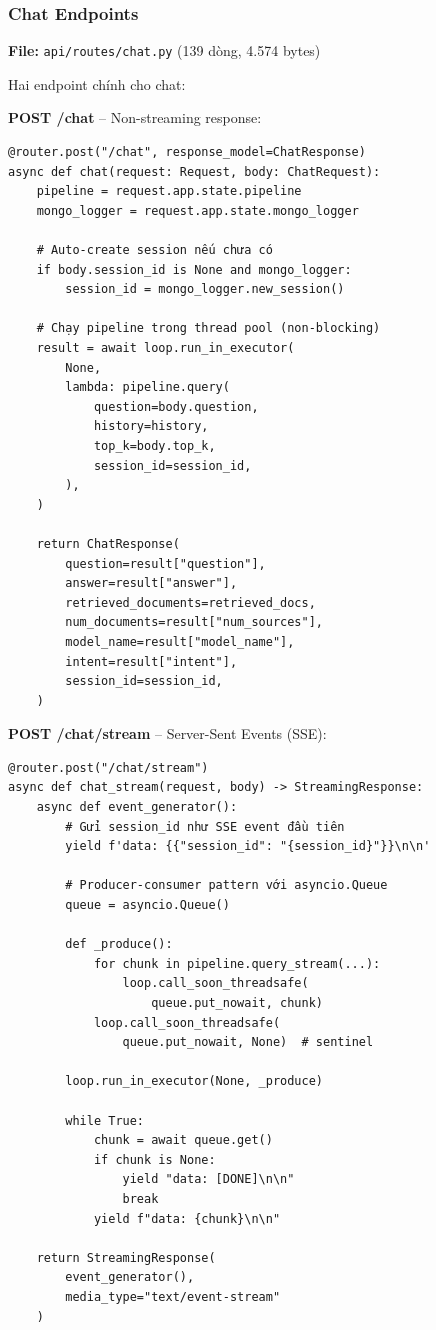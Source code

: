 \documentclass[../DoAn.tex]{subfiles}
\begin{document}
\subsubsection{Chat Endpoints}
\textbf{File:} \texttt{api/routes/chat.py} (139 dòng, 4.574 bytes)

Hai endpoint chính cho chat:

\textbf{POST /chat} -- Non-streaming response:
\begin{verbatim}
@router.post("/chat", response_model=ChatResponse)
async def chat(request: Request, body: ChatRequest):
    pipeline = request.app.state.pipeline
    mongo_logger = request.app.state.mongo_logger

    # Auto-create session nếu chưa có
    if body.session_id is None and mongo_logger:
        session_id = mongo_logger.new_session()

    # Chạy pipeline trong thread pool (non-blocking)
    result = await loop.run_in_executor(
        None,
        lambda: pipeline.query(
            question=body.question,
            history=history,
            top_k=body.top_k,
            session_id=session_id,
        ),
    )

    return ChatResponse(
        question=result["question"],
        answer=result["answer"],
        retrieved_documents=retrieved_docs,
        num_documents=result["num_sources"],
        model_name=result["model_name"],
        intent=result["intent"],
        session_id=session_id,
    )
\end{verbatim}

\textbf{POST /chat/stream} -- Server-Sent Events (SSE):
\begin{verbatim}
@router.post("/chat/stream")
async def chat_stream(request, body) -> StreamingResponse:
    async def event_generator():
        # Gửi session_id như SSE event đầu tiên
        yield f'data: {{"session_id": "{session_id}"}}\n\n'

        # Producer-consumer pattern với asyncio.Queue
        queue = asyncio.Queue()

        def _produce():
            for chunk in pipeline.query_stream(...):
                loop.call_soon_threadsafe(
                    queue.put_nowait, chunk)
            loop.call_soon_threadsafe(
                queue.put_nowait, None)  # sentinel

        loop.run_in_executor(None, _produce)

        while True:
            chunk = await queue.get()
            if chunk is None:
                yield "data: [DONE]\n\n"
                break
            yield f"data: {chunk}\n\n"

    return StreamingResponse(
        event_generator(),
        media_type="text/event-stream"
    )
\end{verbatim}
\end{document}
